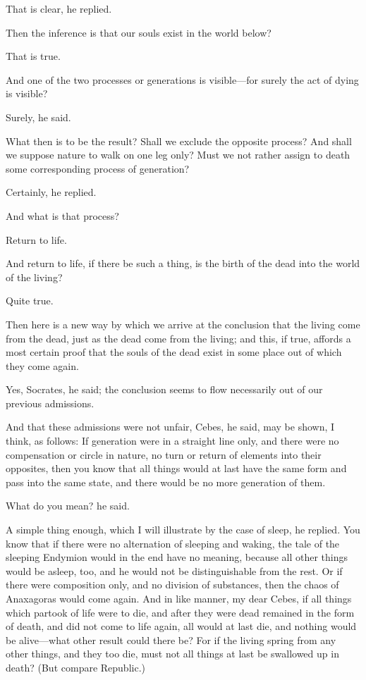 That is clear, he replied.

Then the inference is that our souls exist in the world below?

That is true.

And one of the two processes or generations is visible—for surely
the act of dying is visible?

Surely, he said.

What then is to be the result? Shall we exclude the opposite process? And
shall we suppose nature to walk on one leg only? Must we not rather assign
to death some corresponding process of generation?

Certainly, he replied.

And what is that process?

Return to life.

And return to life, if there be such a thing, is the birth of the dead
into the world of the living?

Quite true.

Then here is a new way by which we arrive at the conclusion that the
living come from the dead, just as the dead come from the living; and
this, if true, affords a most certain proof that the souls of the dead
exist in some place out of which they come again.

Yes, Socrates, he said; the conclusion seems to flow necessarily out of
our previous admissions.

And that these admissions were not unfair, Cebes, he said, may be shown, I
think, as follows: If generation were in a straight line only, and there
were no compensation or circle in nature, no turn or return of elements
into their opposites, then you know that all things would at last have the
same form and pass into the same state, and there would be no more
generation of them.

What do you mean? he said.

A simple thing enough, which I will illustrate by the case of sleep, he
replied. You know that if there were no alternation of sleeping and
waking, the tale of the sleeping Endymion would in the end have no
meaning, because all other things would be asleep, too, and he would not
be distinguishable from the rest. Or if there were composition only, and
no division of substances, then the chaos of Anaxagoras would come again.
And in like manner, my dear Cebes, if all things which partook of life
were to die, and after they were dead remained in the form of death, and
did not come to life again, all would at last die, and nothing would be
alive—what other result could there be? For if the living spring
from any other things, and they too die, must not all things at last be
swallowed up in death? (But compare Republic.)

